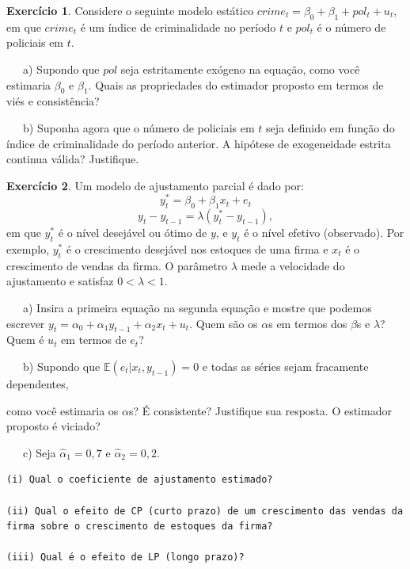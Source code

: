 \documentclass[
]{book}
\theoremstyle{definition}
\theoremstyle{definition}
\theoremstyle{definition}
\newtheorem{exercise}{Exercício}[chapter]
\theoremstyle{remark}
\begin{document}
\begin{exercise}
\protect\hypertarget{exr:exsr7}{}{\label{exr:exsr7} }Considere o seguinte modelo estático \(crime_t=\beta_0+\beta_1+pol_t+u_t\), em que \(crime_t\) é um índice de criminalidade no período \(t\) e \(pol_t\) é o número de policiais em \(t\).

~~~a) Supondo que \(pol\) seja estritamente exógeno na equação, como você estimaria \(\beta_0\) e \(\beta_1\). Quais as propriedades do estimador proposto em termos de viés e consistência?

~~~b) Suponha agora que o número de policiais em \(t\) seja definido em função do índice de criminalidade do período anterior. A hipótese de exogeneidade estrita continua válida? Justifique.
\end{exercise}

\begin{exercise}
\protect\hypertarget{exr:exsr8}{}{\label{exr:exsr8} }Um modelo de ajustamento parcial é dado por:
\[y^*_t=\beta_0+\beta_1x_t+e_t\]
\[y_t-y_{t-1}=\lambda(y^*_t-y_{t-1}),\]
em que \(y^*_t\) é o nível desejável ou ótimo de \(y\), e \(y_t\) é o nível efetivo (observado). Por exemplo, \(y^*_t\) é o crescimento desejável nos estoques de uma firma e \(x_t\) é o crescimento de vendas da firma. O parâmetro \(\lambda\) mede a
velocidade do ajustamento e satisfaz \(0 < \lambda < 1\).

~~~a) Insira a primeira equação na segunda equação e mostre que podemos escrever \(y_t=\alpha_0+\alpha_1 y_{t-1}+\alpha_2 x_t+u_t\). Quem são os \(\alpha\)s em termos dos \(\beta\)s e \(\lambda\)? Quem é \(u_t\) em termos de \(e_t\)?

~~~b) Supondo que \(\mathbb{E}(e_t|x_t,y_{t-1})=0\) e todas as séries sejam fracamente dependentes,

como você estimaria os \(\alpha\)s? É consistente? Justifique sua resposta. O estimador proposto é viciado?

~~~c) Seja \(\hat{\alpha}_1 = 0,7\) e \(\hat{\alpha}_2 = 0,2\).

\begin{verbatim}
(i) Qual o coeficiente de ajustamento estimado?

(ii) Qual o efeito de CP (curto prazo) de um crescimento das vendas da firma sobre o crescimento de estoques da firma?

(iii) Qual é o efeito de LP (longo prazo)?
\end{verbatim}
\end{exercise}
\end{document}
